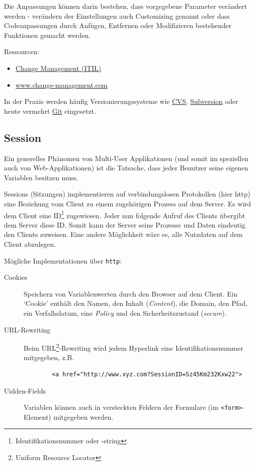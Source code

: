 Die Anpassungen können darin bestehen, dass vorgegebene Parameter verändert werden - verändern
der Einstellungen auch Customizing genannt oder dass Codeanpassungen durch Anfügen,
Entfernen oder Modifizieren bestehender Funktionen gemacht werden.

Ressourcen:
\begin{itemize}
    \item \href{https://de.wikipedia.org/wiki/Change_Management_(ITIL)}{Change Management (ITIL)}
    \item \href{http://www.change-management.com}{www.change-management.com}
\end{itemize}

In der Praxis werden häufig Versionierungssysteme wie \href{https://de.wikipedia.org/wiki/Concurrent_Versions_System}{CVS},
\href{https://de.wikipedia.org/wiki/Apache_Subversion}{Subversion} oder heute
vermehrt \href{https://de.wikipedia.org/wiki/Git}{Git} eingesetzt.

\subsection{Session}
\label{subsec:session}

Ein generelles Phänomen von Multi-User Applikationen (und somit im speziellen auch
von Web-Applikationen) ist die Tatsache, dass jeder Benutzer seine eigenen Variablen
besitzen muss.

Sessions (Sitzungen) implementieren auf verbindungslosen Protokollen (hier http) eine
Beziehung vom Client zu einem zugehörigen Prozess auf dem Server. Es wird dem Client eine
ID\footnote{Identifikationsnummer oder -string} zugewiesen. Jeder nun folgende Aufruf des
Clients übergibt dem Server diese ID. Somit kann der Server seine Prozesse und Daten eindeutig
den Clients zuweisen. Eine andere Möglichkeit wäre es, alle Nutzdaten auf dem Client abzulegen.

Mögliche Implementationen über \texttt{http}:
\begin{description}
    \item[Cookies] Speichern von Variablenwerten durch den Browser auf dem Client.
    Ein `Cookie' enthält den Namen, den Inhalt (\emph{Content}), die Domain, den Pfad, ein
    Verfallsdatum, eine \emph{Policy} und den Sicherheitszustand (\emph{secure}).

    \item[URL-Rewriting] Beim URL\footnote{Uniform Resource Locator}-Rewriting wird jedem
    Hyperlink eine Identifikationsnummer mitgegeben, z.B.

    \begin{verbatim}
        <a href="http://www.xyz.com?SessionID=Sz45Km232Kxw22">
    \end{verbatim}

    \item[Uidden-Fields] Variablen können auch in versteckten Feldern der
    Formulare (im \texttt{<form>}-Element) mitgegeben werden.
\end{description}

